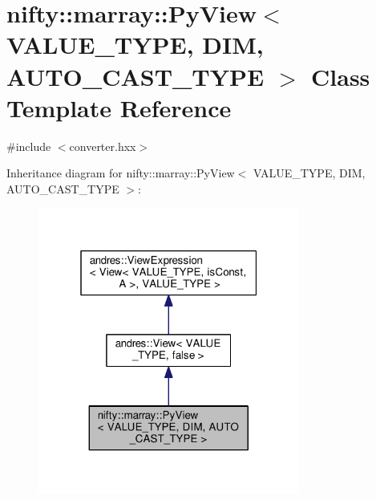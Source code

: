 \hypertarget{classnifty_1_1marray_1_1PyView}{}\section{nifty\+:\+:marray\+:\+:Py\+View$<$ V\+A\+L\+U\+E\+\_\+\+T\+Y\+P\+E, D\+I\+M, A\+U\+T\+O\+\_\+\+C\+A\+S\+T\+\_\+\+T\+Y\+P\+E $>$ Class Template Reference}
\label{classnifty_1_1marray_1_1PyView}


{\ttfamily \#include $<$converter.\+hxx$>$}



Inheritance diagram for nifty\+:\+:marray\+:\+:Py\+View$<$ V\+A\+L\+U\+E\+\_\+\+T\+Y\+P\+E, D\+I\+M, A\+U\+T\+O\+\_\+\+C\+A\+S\+T\+\_\+\+T\+Y\+P\+E $>$\+:\nopagebreak
\begin{figure}[H]
\begin{center}
\leavevmode
\includegraphics[width=244pt]{classnifty_1_1marray_1_1PyView__inherit__graph}
\end{center}
\end{figure}


